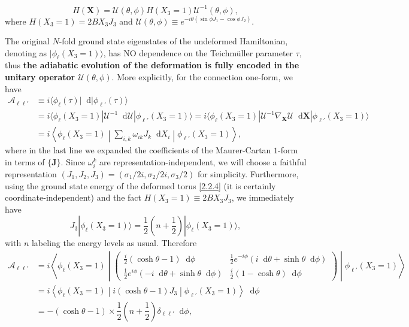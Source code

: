 \documentclass[10pt,nofootinbib,letterpaper]{revtex4}
\newcommand*\dd{\mathop{}\!\mathrm{d}}
\begin{document}
		\begin{equation}\label{2.3.5}
			H(\bm{X})=\mathcal{U}(\theta,\phi)H(X_3=1)\mathcal{U}^{-1}(\theta,\phi),
		\end{equation}
		where $H(X_3=1)=2BX_3J_3$ and $\mathcal{U}(\theta,\phi)\equiv e^{-i\theta(\sin\phi J_1-\cos\phi J_2)}$.\par
		The original $N$-fold ground state eigenstates of the undeformed Hamiltonian, denoting as $|\phi_\ell(X_3=1)\rangle$, has NO dependence on the Teichm\"{u}ller parameter $\tau$, thus \textbf{the adiabatic evolution of the deformation is fully encoded in the unitary operator $\mathcal{U}(\theta,\phi)$}. More explicitly, for the connection one-form, we have \cite{levay1993algebraic}
		\begin{align}
			\mathcal{A}_{\ell\ell'}&\equiv i\langle\phi_\ell(\tau)|\dd|\phi_{\ell'}(\tau)\rangle\nonumber\\
			&=i\langle\phi_\ell(X_3=1)|\mathcal{U}^{-1}\dd\mathcal{U}|\phi_{\ell'}(X_3=1)\rangle=i\langle\phi_\ell(X_3=1)|\mathcal{U}^{-1}\nabla_{\bm{X}}\mathcal{U}\dd\bm{X}|\phi_{\ell'}(X_3=1)\rangle\nonumber\\
			&=i\left\langle\phi_\ell(X_3=1)\middle|\sum_{i,k}\omega_{ik}J_k\dd X_i\middle|\phi_{\ell'}(X_3=1)\right\rangle,\label{2.3.6}
		\end{align}
		where in the last line we expanded the coefficients of the Maurer-Cartan $1$-form in terms of $\{\bm{J}\}$. Since $\omega_i^k$ are representation-independent, we will choose a faithful representation $(J_1,J_2,J_3)=(\sigma_1/2i,\sigma_2/2i,\sigma_3/2)$ for simplicity. Furthermore, using the ground state energy of the deformed torus \eqref{2.2.4} (it is certainly coordinate-independent) and the fact $H(X_3=1)\equiv 2BX_3J_3$, we immediately have
		\begin{equation*}
			J_3|\phi_\ell(X_3=1)\rangle=\dfrac{1}{2}\left(n+\dfrac{1}{2}\right)|\phi_\ell(X_3=1)\rangle,
		\end{equation*}
		with $n$ labeling the energy levels as usual. Therefore
		\begin{align*}
			\mathcal{A}_{\ell\ell'}&=i\left\langle\phi_\ell(X_3=1)\middle|\left(\begin{array}{cc}
				\frac{i}{2}(\cosh\theta-1)\dd\phi & \frac{1}{2}e^{-i\phi}(i\dd\theta+\sinh\theta\dd\phi) \\[0.8em]
				\frac{1}{2}e^{i\phi}(-i\dd\theta+\sinh\theta\dd\phi) & \frac{i}{2}(1-\cosh\theta)\dd\phi
			\end{array}\right)\middle|\phi_{\ell'}(X_3=1)\right\rangle\\
			&=i\left\langle\phi_{\ell}(X_3=1)\middle|i(\cosh\theta-1)J_3\middle|\phi_{\ell'}(X_3=1)\right\rangle\dd\phi\\
			&=-(\cosh\theta-1)\times\dfrac{1}{2}\left(n+\dfrac{1}{2}\right)\delta_{\ell\ell'}\dd\phi,
		\end{align*}
\end{document}
